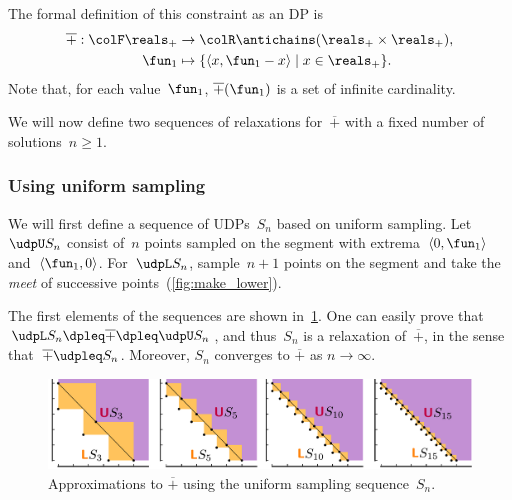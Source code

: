 The formal definition of this constraint as an DP is
\begin{align*}
  \overline{+}:{\colF\reals_{+}} & \rightarrow{\colR\antichains(\reals_{+}\times\reals_{+})},\\
  \fun_{1} & \mapsto\{\left\langle x,\fun_{1}-x\right\rangle \mid x\in\reals_{+}\}.
\end{align*}
Note that, for each value~$\fun_{1}$, $\overline{+}(\fun_{1})$
is a set of infinite cardinality.

We will now define two sequences of relaxations for~$\overline{+}$
with a fixed number of solutions~$n\geq1$.

\subsubsection*{Using uniform sampling}

We will first define a sequence of UDPs~$S_{n}$ based on uniform
sampling. Let~$\udpU S_{n}$ consist of~$n$ points sampled on the
segment with extrema~$\left\langle 0,\fun_{1}\right\rangle $ and~$\left\langle \fun_{1},0\right\rangle $.
For~$\udpL S_{n}$, sample~$n+1$ points on the segment and take
the \emph{meet} of successive points~(\cref{fig:make_lower}).
\begin{center}
  \par
\end{center}

The first elements of the sequences are shown in~\cref{fig:approx_invplus}.
One can easily prove that $\udpL S_{n}\dpleq\overline{+}\dpleq\udpU S_{n}$,
and thus~$S_{n}$ is a relaxation of~$\overline{+}$, in the sense
that~$\overline{+}\udpleq S_{n}$. Moreover, $S_{n}$ converges to
$\overline{+}$ as $n\rightarrow\infty$.
\begin{center}
  \begin{figure}[h]
    \centering{}\includegraphics[scale=0.33]{unc_sampling}\caption{\label{fig:approx_invplus}Approximations to $\overline{+}$ using
    the uniform sampling sequence~$S_{n}$. }
  \end{figure}
  \par
\end{center}

